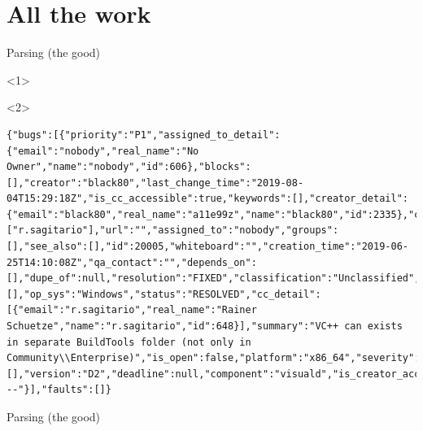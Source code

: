 \documentclass[aspectratio=169,notes]{beamer}
\begin{document}
	\section{All the work}
	\begin{frame}[fragile]{Parsing (the good)}
		
		\begin{onlyenv}<1>
			\vspace{4cm}
		\end{onlyenv}
		\begin{onlyenv}<2>
\begin{lstlisting}[basicstyle=\tiny\ttfamily,numbers=none]
{"bugs":[{"priority":"P1","assigned_to_detail":{"email":"nobody","real_name":"No Owner","name":"nobody","id":606},"blocks":[],"creator":"black80","last_change_time":"2019-08-04T15:29:18Z","is_cc_accessible":true,"keywords":[],"creator_detail":{"email":"black80","real_name":"a11e99z","name":"black80","id":2335},"cc":["r.sagitario"],"url":"","assigned_to":"nobody","groups":[],"see_also":[],"id":20005,"whiteboard":"","creation_time":"2019-06-25T14:10:08Z","qa_contact":"","depends_on":[],"dupe_of":null,"resolution":"FIXED","classification":"Unclassified","alias":[],"op_sys":"Windows","status":"RESOLVED","cc_detail":[{"email":"r.sagitario","real_name":"Rainer Schuetze","name":"r.sagitario","id":648}],"summary":"VC++ can exists in separate BuildTools folder (not only in Community\\Enterprise)","is_open":false,"platform":"x86_64","severity":"enhancement","flags":[],"version":"D2","deadline":null,"component":"visuald","is_creator_accessible":true,"product":"D","is_confirmed":true,"target_milestone":"---"}],"faults":[]}
		\end{lstlisting}
		\end{onlyenv}
	\end{frame}
	\begin{frame}[fragile]{Parsing (the good)}
			
	\end{frame}
\end{document}
